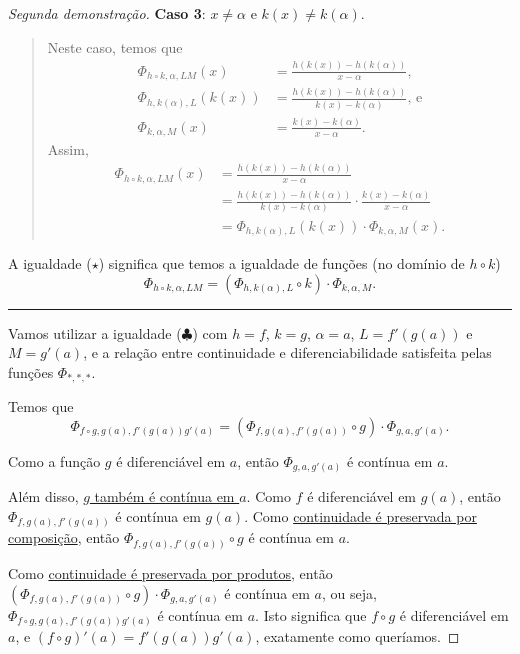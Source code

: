 \begin{proof}[Segunda demonstração]
	\textbf{Caso 3}: $x\neq \alpha$ e $k(x)\neq k(\alpha)$.
	\begin{quote}
		Neste caso, temos que
		\begin{align*}
			\Phi_{h\circ k,\alpha,LM}(x)&=\frac{h(k(x))-h(k(\alpha))}{x-\alpha}\text{,}\\
			\Phi_{h,k(\alpha),L}(k(x))&=\frac{h(k(x))-h(k(\alpha))}{k(x)-k(\alpha)}\text{, e}\\
			\Phi_{k,\alpha,M}(x)&=\frac{k(x)-k(\alpha)}{x-\alpha}.
		\end{align*}
		Assim,
		\begin{align*}
			\Phi_{h\circ k,\alpha,LM}(x)&=\frac{h(k(x))-h(k(\alpha))}{x-\alpha}\\
			&=\frac{h(k(x))-h(k(\alpha))}{k(x)-k(\alpha)}\cdot\frac{k(x)-k(\alpha)}{x-\alpha}\\
			&=\Phi_{h,k(\alpha),L}(k(x))\cdot \Phi_{k,\alpha,M}(x).
		\end{align*}
	\end{quote}
	
	A igualdade ($\star$) significa que temos a igualdade de funções (no domínio de $h\circ k$)
	\[\Phi_{h\circ k,\alpha,LM}=\left(\Phi_{h,k(\alpha),L}\circ k\right)\cdot \Phi_{k,\alpha,M}\tag{$\clubsuit$}.\]
	
	\hrule
	
	Vamos utilizar a igualdade ($\clubsuit$) com $h=f$, $k=g$, $\alpha=a$, $L=f'(g(a))$ e $M=g'(a)$, e a relação entre continuidade e diferenciabilidade satisfeita pelas funções $\Phi_{\ast,\ast,\ast}$.

	Temos que
	\[\Phi_{f\circ g,g(a),f'(g(a))g'(a)}=\left(\Phi_{f,g(a),f'(g(a))}\circ g\right)\cdot \Phi_{g,a,g'(a)}.\]
	
	Como a função $g$ é diferenciável em $a$, então $\Phi_{g,a,g'(a)}$ é contínua em $a$.
	
	Além disso, \href{../09.derivadas/teo_funcoes_derivaveis_sao_continuas_moodle.html}{$g$ também é contínua em $a$}. Como $f$ é diferenciável em $g(a)$, então $\Phi_{f,g(a),f'(g(a))}$ é contínua em $g(a)$. Como \href{../07.fun_cont/teo_comp_cont_moodle.html}{continuidade é preservada por composição}, então $\Phi_{f,g(a),f'(g(a))}\circ g$ é contínua em $a$.
	
	Como \href{../07.fun_cont/teo_prop_fun_cont_moodle.html}{continuidade é preservada por produtos}, então $\left(\Phi_{f,g(a),f'(g(a))}\circ g\right)\cdot \Phi_{g,a,g'(a)}$ é contínua em $a$, ou seja, $\Phi_{f\circ g,g(a),f'(g(a))g'(a)}$ é contínua em $a$. Isto significa que $f\circ g$ é diferenciável em $a$, e $(f\circ g)'(a)=f'(g(a))g'(a)$, exatamente como queríamos.
\end{proof}